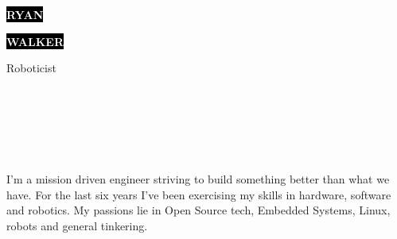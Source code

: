 \documentclass[9pt]{developercv} %
\begin{document}

\begin{minipage}[t]{0.4\textwidth} %
	\vspace{-\baselineskip} %
	
	\colorbox{black}{{\HUGE\textcolor{white}{\textbf{\MakeUppercase{Ryan}}}}} %
	
	\colorbox{black}{{\HUGE\textcolor{white}{\textbf{\MakeUppercase{Walker}}}}} %
	
	\vspace{6pt}
	
	{\huge Roboticist} %
\end{minipage}
\begin{minipage}[t]{0.275\textwidth} %
	\vspace{-\baselineskip} %
	
	\\
	\\
	\\	
\end{minipage}
\begin{minipage}[t]{0.275\textwidth} %
	\vspace{-\baselineskip} %
	
	\\
\end{minipage}

\vspace{0.5cm}



\begin{minipage}[t]{0.4\textwidth} %
	\vspace{-\baselineskip} %

I'm a mission driven engineer striving to build something better than what we
have. For the last six years I've been exercising my skills in hardware,
software and robotics. My passions lie in Open Source tech, Embedded Systems,
Linux, robots and general tinkering.  

\end{minipage}
\end{document}
